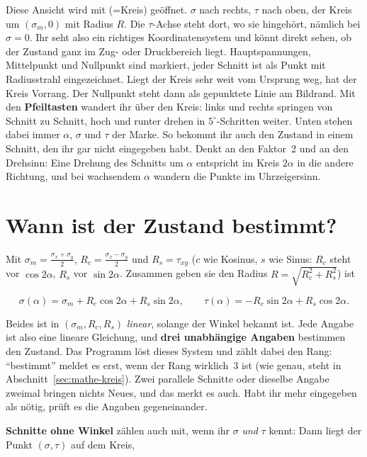 Diese Ansicht wird mit  (=Kreis) geöffnet. $\sigma$ nach rechts, $\tau$ nach oben, der Kreis um
$(\sigma_m, 0)$ mit Radius $R$. Die $\tau$-Achse steht dort, wo sie hingehört, nämlich bei
$\sigma = 0$. Ihr seht also ein richtiges Koordinatensystem und könnt direkt sehen, ob der
Zustand ganz im Zug- oder Druckbereich liegt. Hauptspannungen, Mittelpunkt und Nullpunkt sind
markiert, jeder Schnitt ist als Punkt mit Radiusstrahl eingezeichnet. Liegt der Kreis sehr weit
vom Ursprung weg, hat der Kreis Vorrang. Der Nullpunkt steht dann als gepunktete Linie am
Bildrand. Mit den \textbf{Pfeiltasten} wandert ihr über den Kreis: links und rechts springen von
Schnitt zu Schnitt, hoch und runter drehen in $5^\circ$-Schritten weiter. Unten stehen dabei
immer $\alpha$, $\sigma$ und $\tau$ der Marke. So bekommt ihr auch den Zustand in einem Schnitt,
den ihr gar nicht eingegeben habt. Denkt an den Faktor~2 und an den Drehsinn: Eine Drehung des Schnitts um $\alpha$ entspricht im Kreis
$2\alpha$ in die andere Richtung, und bei wachsendem $\alpha$ wandern die Punkte im Uhrzeigersinn.


\section{Wann ist der Zustand bestimmt?}

Mit $\sigma_m = \frac{\sigma_x+\sigma_y}{2}$, $R_c = \frac{\sigma_x-\sigma_y}{2}$ und
$R_s = \tau_{xy}$ ($c$ wie Kosinus, $s$ wie Sinus: $R_c$ steht vor $\cos 2\alpha$, $R_s$ vor
$\sin 2\alpha$. Zusammen geben sie den Radius $R = \sqrt{R_c^2 + R_s^2}$) ist

\[
  \sigma(\alpha) = \sigma_m + R_c\cos 2\alpha + R_s\sin 2\alpha, \qquad
  \tau(\alpha) = -R_c\sin 2\alpha + R_s\cos 2\alpha .
\]

Beides ist in $(\sigma_m, R_c, R_s)$ \emph{linear}, solange der Winkel bekannt ist. Jede Angabe
ist also eine lineare Gleichung, und \textbf{drei unabhängige Angaben} bestimmen den Zustand.
Das Programm löst dieses System und zählt dabei den Rang: \enquote{bestimmt} meldet es erst,
wenn der Rang wirklich~3 ist (wie genau, steht in Abschnitt~\ref{sec:mathe-kreis}). Zwei parallele Schnitte oder dieselbe Angabe zweimal bringen
nichts Neues, und das merkt es auch. Habt ihr mehr eingegeben als nötig, prüft es die Angaben
gegeneinander.

\textbf{Schnitte ohne Winkel} zählen auch mit, wenn ihr $\sigma$ \emph{und} $\tau$ kennt: Dann
liegt der Punkt $(\sigma, \tau)$ auf dem Kreis,

